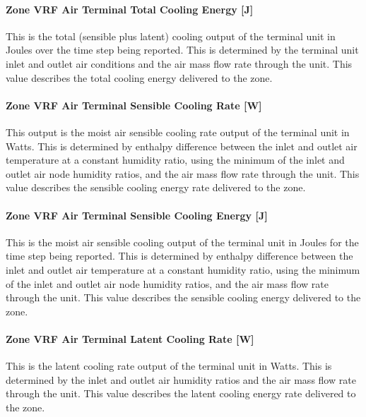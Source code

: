 \paragraph{Zone VRF Air Terminal Total Cooling Energy {[}J{]}}\label{zone-vrf-air-terminal-total-cooling-energy-j}

This is the total (sensible plus latent) cooling output of the terminal unit in Joules over the time step being reported. This is determined by the terminal unit inlet and outlet air conditions and the air mass flow rate through the unit. This value describes the total cooling energy delivered to the zone.

\paragraph{Zone VRF Air Terminal Sensible Cooling Rate {[}W{]}}\label{zone-vrf-air-terminal-sensible-cooling-rate-w}

This output is the moist air sensible cooling rate output of the terminal unit in Watts. This is determined by enthalpy difference between the inlet and outlet air temperature at a constant humidity ratio, using the minimum of the inlet and outlet air node humidity ratios, and the air mass flow rate through the unit. This value describes the sensible cooling energy rate delivered to the zone.

\paragraph{Zone VRF Air Terminal Sensible Cooling Energy {[}J{]}}\label{zone-vrf-air-terminal-sensible-cooling-energy-j}

This is the moist air sensible cooling output of the terminal unit in Joules for the time step being reported. This is determined by enthalpy difference between the inlet and outlet air temperature at a constant humidity ratio, using the minimum of the inlet and outlet air node humidity ratios, and the air mass flow rate through the unit. This value describes the sensible cooling energy delivered to the zone.

\paragraph{Zone VRF Air Terminal Latent Cooling Rate {[}W{]}}\label{zone-vrf-air-terminal-latent-cooling-rate-w}

This is the latent cooling rate output of the terminal unit in Watts. This is determined by the inlet and outlet air humidity ratios and the air mass flow rate through the unit. This value describes the latent cooling energy rate delivered to the zone.

